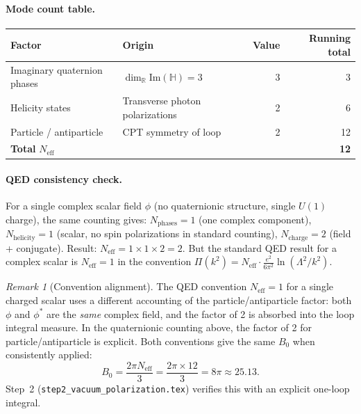 \documentclass[12pt,a4paper]{article}
\theoremstyle{definition}
\theoremstyle{remark}
\newtheorem{remark}[theorem]{Remark}
\newcommand{\R}{\mathbb{R}}
\renewcommand{\H}{\mathbb{H}}
\newcommand{\Neff}{N_{\mathrm{eff}}}
\begin{document}
\paragraph{Mode count table.}
\begin{center}
\begin{tabular}{llrr}
  \toprule
  \textbf{Factor} & \textbf{Origin} & \textbf{Value} & \textbf{Running total} \\
  \midrule
  Imaginary quaternion phases & $\dim_\R \mathrm{Im}(\H) = 3$ & 3 & 3 \\
  Helicity states & Transverse photon polarizations & 2 & 6 \\
  Particle / antiparticle & CPT symmetry of loop & 2 & 12 \\
  \midrule
  \textbf{Total} $\Neff$ & & & \textbf{12} \\
  \bottomrule
\end{tabular}
\end{center}

\paragraph{QED consistency check.}
For a single complex scalar field $\phi$ (no quaternionic structure, single
$U(1)$ charge), the same counting gives:
$N_\mathrm{phases} = 1$ (one complex component),
$N_\mathrm{helicity} = 1$ (scalar, no spin polarizations in standard counting),
$N_\mathrm{charge} = 2$ (field + conjugate).
Result: $\Neff = 1 \times 1 \times 2 = 2$.  But the standard QED result for
a complex scalar is $\Neff = 1$ in the convention $\Pi(k^2) = \Neff \cdot
\frac{e^2}{6\pi^2}\ln(\Lambda^2/k^2)$.

\begin{remark}[Convention alignment]
The QED convention $\Neff = 1$ for a single charged scalar uses a different
accounting of the particle/antiparticle factor: both $\phi$ and $\phi^*$
are the \emph{same} complex field, and the factor of 2 is absorbed into the
loop integral measure.  In the quaternionic counting above, the factor of 2
for particle/antiparticle is explicit.  Both conventions give the same $B_0$
when consistently applied:
\begin{equation}
  B_0 = \frac{2\pi \Neff}{3} = \frac{2\pi \times 12}{3} = 8\pi \approx 25.13.
  \label{eq:B0}
\end{equation}
Step~2 (\texttt{step2\_vacuum\_polarization.tex}) verifies this with an
explicit one-loop integral.
\end{remark}
\end{document}
